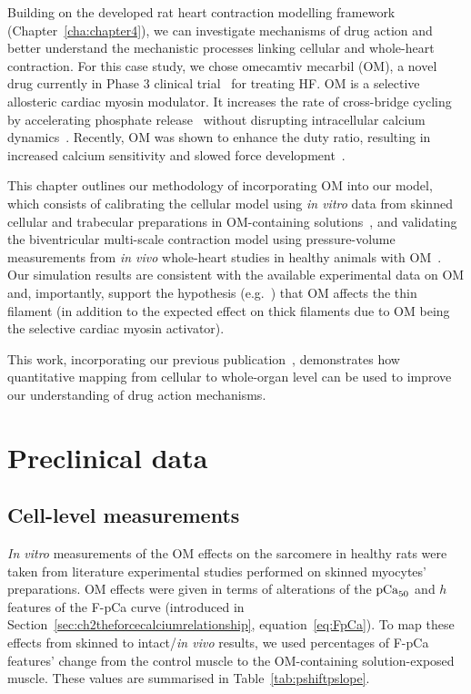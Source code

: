 \vspace{0.2cm}
Building on the developed rat heart contraction modelling framework (Chapter~\ref{cha:chapter4}), we can investigate mechanisms of drug action and better understand the mechanistic processes linking cellular and whole-heart contraction. For this case study, we chose omecamtiv mecarbil (\acs{OM}), a novel drug currently in Phase $3$ clinical trial~\cite{Teerlink:2021} for treating HF. OM is a selective allosteric cardiac myosin modulator. It increases the rate of cross-bridge cycling by accelerating phosphate release~\cite{Malik:2011} without disrupting intracellular calcium dynamics~\cite{Horvath:2017}. Recently, OM was shown to enhance the duty ratio, resulting in increased calcium sensitivity and slowed force development~\cite{Swenson:2017, Kampourakis:2018}.

\vspace{0.2cm}
This chapter outlines our methodology of incorporating OM into our model, which consists of calibrating the cellular model using \textit{in vitro} data from skinned cellular and trabecular preparations in OM-containing solutions~\cite{Nagy:2015,Kampourakis:2018,Kieu:2019}, and validating the biventricular multi-scale contraction model using pressure-volume measurements from \textit{in vivo} whole-heart studies in healthy animals with OM~\cite{Bakkehaug:2015}. Our simulation results are consistent with the available experimental data on OM and, importantly, support the hypothesis (e.g.~\cite{Swenson:2017}) that OM affects the thin filament (in addition to the expected effect on thick filaments due to OM being the selective cardiac myosin activator).

\vspace{0.2cm}
This work, incorporating our previous publication~\cite{Longobardi:2021}, demonstrates how quantitative mapping from cellular to whole-organ level can be used to improve our understanding of drug action mechanisms.


%
%
%
\section{Preclinical data}\label{sec:ch5preclinical_data}


%
%
%
\subsection{Cell-level measurements}\label{sec:ch5celllevelmeasurements}
\textit{In vitro} measurements of the OM effects on the sarcomere in healthy rats were taken from literature experimental studies performed on skinned myocytes' preparations. OM effects were given in terms of alterations of the $\textrm{pCa}_{50}$ and $h$ features of the F-pCa curve (introduced in Section~\ref{sec:ch2theforcecalciumrelationship}, equation~\eqref{eq:FpCa}). To map these effects from skinned to intact/\textit{in vivo} results, we used percentages of F-pCa features' change from the control muscle to the OM-containing solution-exposed muscle. These values are summarised in Table~\ref{tab:pshiftpslope}.

